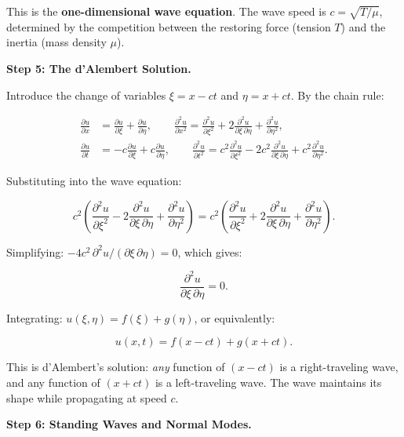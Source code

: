 This is the \textbf{one-dimensional wave equation}. The wave speed is $c = \sqrt{T/\mu}$, determined by the competition between the restoring force (tension $T$) and the inertia (mass density $\mu$).

\textbf{Step 5: The d'Alembert Solution.}

Introduce the change of variables $\xi = x - ct$ and $\eta = x + ct$. By the chain rule:

\begin{align}
\frac{\partial u}{\partial x} &= \frac{\partial u}{\partial \xi} + \frac{\partial u}{\partial \eta}, \qquad \frac{\partial^2 u}{\partial x^2} = \frac{\partial^2 u}{\partial \xi^2} + 2\frac{\partial^2 u}{\partial \xi\,\partial \eta} + \frac{\partial^2 u}{\partial \eta^2}, \\
\frac{\partial u}{\partial t} &= -c\frac{\partial u}{\partial \xi} + c\frac{\partial u}{\partial \eta}, \qquad \frac{\partial^2 u}{\partial t^2} = c^2\frac{\partial^2 u}{\partial \xi^2} - 2c^2\frac{\partial^2 u}{\partial \xi\,\partial \eta} + c^2\frac{\partial^2 u}{\partial \eta^2}.
\end{align}

Substituting into the wave equation:

\begin{equation}
c^2\left(\frac{\partial^2 u}{\partial \xi^2} - 2\frac{\partial^2 u}{\partial \xi\,\partial \eta} + \frac{\partial^2 u}{\partial \eta^2}\right) = c^2\left(\frac{\partial^2 u}{\partial \xi^2} + 2\frac{\partial^2 u}{\partial \xi\,\partial \eta} + \frac{\partial^2 u}{\partial \eta^2}\right).
\end{equation}

Simplifying: $-4c^2\,\partial^2 u/(\partial\xi\,\partial\eta) = 0$, which gives:

\begin{equation}
\frac{\partial^2 u}{\partial \xi\,\partial \eta} = 0.
\end{equation}

Integrating: $u(\xi, \eta) = f(\xi) + g(\eta)$, or equivalently:

\begin{equation}
\boxed{u(x,t) = f(x - ct) + g(x + ct).}
\end{equation}

This is d'Alembert's solution: \emph{any} function of $(x - ct)$ is a right-traveling wave, and any function of $(x + ct)$ is a left-traveling wave. The wave maintains its shape while propagating at speed $c$.

\textbf{Step 6: Standing Waves and Normal Modes.}

